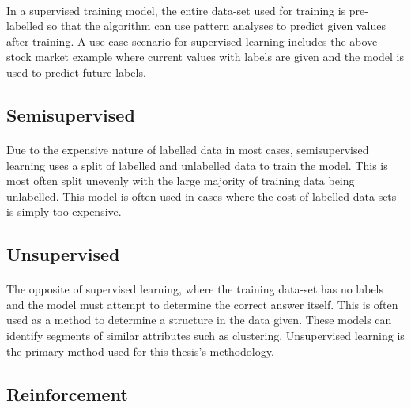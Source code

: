 \paragraph{}In a supervised training model, the entire data-set used for training is pre-labelled so that the algorithm can use pattern analyses to predict given values after training. A use case scenario for supervised learning includes the above stock market example where current values with labels are given and the model is used to predict future labels.

\subsection{Semisupervised} 

\label{ssec:subsection4}

\paragraph{}Due to the expensive nature of labelled data in most cases, semisupervised learning uses a split of labelled and unlabelled data to train the model. This is most often split unevenly with the large majority of training data being unlabelled. This model is often used in cases where the cost of labelled data-sets is simply too expensive.

\subsection{Unsupervised} 

\label{ssec:subsection5}

\paragraph{}The opposite of supervised learning, where the training data-set has no labels and the model must attempt to determine the correct answer itself. This is often used as a method to determine a structure in the data given. These models can identify segments of similar attributes such as clustering. Unsupervised learning is the primary method used for this thesis’s methodology.

\subsection{Reinforcement} 
\label{ssec:subsection6}
